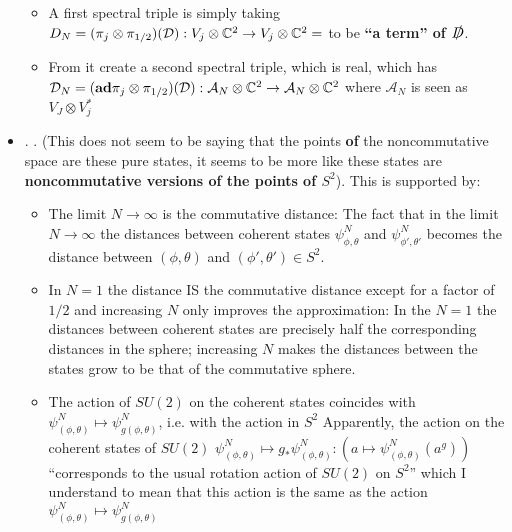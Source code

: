 \documentclass{article}
\begin{document}
\begin{itemize}
\begin{itemize}
\begin{itemize}
                \end{itemize}
            
            \item A first spectral triple is simply taking $D_N = (\pi_j \otimes \pi_{1/2})(\mathcal D): V_j \otimes \mathbb{C}^2 \to V_j \otimes \mathbb{C}^2 = $ to be \textbf{``a term'' of $\slashed D$}.
            
            \item From it create a second spectral triple, which is real, which has $\mathcal D_N = (\textbf{ad}\pi_j \otimes \pi_{1/2})(\mathcal D): \mathcal A_N \otimes \mathbb{C}^2 \to \mathcal A_N \otimes \mathbb{C}^2$ where $\mathcal A_N$ is seen as $V_J \otimes V_j^*$
            
        \end{itemize}
    
    \item {}. . (This does not seem to be saying that the points \textbf{of} the noncommutative space are these pure states, it seems to be more like these states are \textbf{noncommutative versions of the points of $S^2$}). This is supported by: 
    
        \begin{itemize}
        
        \item The limit $N \to \infty$ is the commutative distance: The fact that in the limit $N \to \infty$ the distances between coherent states $\psi^N_{\phi, \theta}$ and $\psi^N_{\phi', \theta'}$ becomes the distance between $(\phi, \theta)$ and $(\phi', \theta') \in S^2$.
        
        \item In $N = 1$ the distance IS the commutative distance except for a factor of $1/2$ and increasing $N$ only improves the approximation: In the $N = 1$ the distances between coherent states are precisely half the corresponding distances in the sphere; increasing $N$ makes the distances between the states grow to be that of the commutative sphere.
        
        \item The action of $SU(2)$ on the coherent states coincides with $\psi^N_{(\phi, \theta)} \mapsto \psi^N_{g(\phi, \theta)}$, i.e. with the action in $S^2$ Apparently,  the action on the coherent states of $SU(2)$ $\psi^N_{(\phi, \theta)} \mapsto g_*\psi^N_{(\phi, \theta)}:(a \mapsto \psi^N_{(\phi, \theta)}(a^g))$ ``corresponds to the usual rotation action of $SU(2)$ on $S^2$'' which I understand to mean that this action is the same as the action $\psi^N_{(\phi, \theta)} \mapsto \psi^N_{g(\phi, \theta)}$
        

\end{itemize}
\end{itemize}
\end{document}
